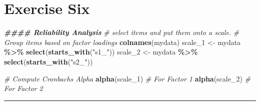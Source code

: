 \documentclass[
]{book}
\newenvironment{Shaded}{\begin{snugshade}}{\end{snugshade}}
\newcommand{\AttributeTok}[1]{\textcolor[rgb]{0.13,0.29,0.53}{#1}}
\newcommand{\CommentTok}[1]{\textcolor[rgb]{0.56,0.35,0.01}{\textit{#1}}}
\newcommand{\DecValTok}[1]{\textcolor[rgb]{0.00,0.00,0.81}{#1}}
\newcommand{\DocumentationTok}[1]{\textcolor[rgb]{0.56,0.35,0.01}{\textbf{\textit{#1}}}}
\newcommand{\FloatTok}[1]{\textcolor[rgb]{0.00,0.00,0.81}{#1}}
\newcommand{\FunctionTok}[1]{\textcolor[rgb]{0.13,0.29,0.53}{\textbf{#1}}}
\newcommand{\NormalTok}[1]{#1}
\newcommand{\OtherTok}[1]{\textcolor[rgb]{0.56,0.35,0.01}{#1}}
\newcommand{\SpecialCharTok}[1]{\textcolor[rgb]{0.81,0.36,0.00}{\textbf{#1}}}
\newcommand{\StringTok}[1]{\textcolor[rgb]{0.31,0.60,0.02}{#1}}
\let\oldsection\section
\renewcommand{\section}{\needspace{5\baselineskip}\oldsection}
\begin{document}
\begin{Shaded}
\end{Shaded}

\section{Exercise Six}\label{exercise-six}

\begin{Shaded}
\begin{Highlighting}[]
\DocumentationTok{\#\#\#\#  Reliability Analysis}
\CommentTok{\# select items and put them onto a scale.}
\CommentTok{\# Group items based on factor loadings}
\FunctionTok{colnames}\NormalTok{(mydata)}
\NormalTok{scale\_1 }\OtherTok{\textless{}{-}}\NormalTok{ mydata }\SpecialCharTok{\%\textgreater{}\%} \FunctionTok{select}\NormalTok{(}\FunctionTok{starts\_with}\NormalTok{(}\StringTok{"s1\_"}\NormalTok{))}
\NormalTok{scale\_2  }\OtherTok{\textless{}{-}}\NormalTok{ mydata }\SpecialCharTok{\%\textgreater{}\%} \FunctionTok{select}\NormalTok{(}\FunctionTok{starts\_with}\NormalTok{(}\StringTok{"s2\_"}\NormalTok{))}

\CommentTok{\# Compute Cronbach\textquotesingle{}s Alpha}
\FunctionTok{alpha}\NormalTok{(scale\_1)  }\CommentTok{\# For Factor 1}
\FunctionTok{alpha}\NormalTok{(scale\_2)  }\CommentTok{\# For Factor 2}
\end{Highlighting}
\end{Shaded}

\begin{center}\rule{0.5\linewidth}{0.5pt}\end{center}
\end{document}
